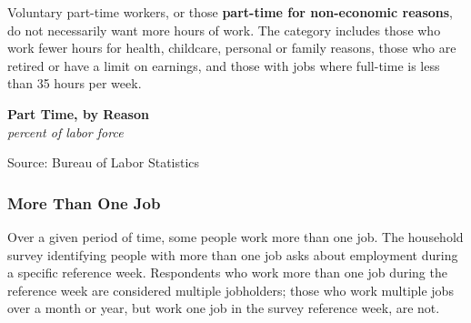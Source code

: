 \documentclass{report}
\makeatletter
\newcommand{\tbllink}[1]{\href{https://raw.githubusercontent.com/bdecon/US-chartbook/master/chartbook/data/#1}{\faTable}}
\newcommand*\short[1]{\expandafter\@gobbletwo\number\numexpr#1\relax}
\newcommand{\absnode}[3]{\node[below right, align=left] at (axis cs: #1,#2) {#3};}
\newcommand{\shdateaxisticks}{
		date coordinates in=x, axis line style={draw=none},
		xmax={2023-11-01},
		max space between ticks=40,	    
		xtick={{1990-01-01}, {1995-01-01}, {2000-01-01}, 
			{2005-01-01}, {2010-01-01}, {2015-01-01}, {2020-01-01}},
		minor xtick={},
		enlarge y limits={0.06}, enlarge x limits={0.01},
		}
\newcommand{\bbar}[2]{extra #1 ticks = {{#2}}, extra #1 tick labels = ,
		extra #1 tick style = {grid=major, grid style={thick, black!25}},}
\newcommand{\stdline}[4]{\addplot[very thick, no markers, color=#1] 
		table [x=#2, y=#3, col sep=comma] {#4};	}
\newcommand{\rebars}{
		\fill[color=black!10] (axis cs:{2007-12-01},\pgfkeysvalueof{/pgfplots/ymin}) rectangle 
			(axis cs:{2009-07-01}, \pgfkeysvalueof{/pgfplots/ymax});
		\fill[color=black!10] (axis cs:{2001-03-01},\pgfkeysvalueof{/pgfplots/ymin}) rectangle 
			(axis cs:{2001-11-01}, \pgfkeysvalueof{/pgfplots/ymax});
		\fill[color=black!10] (axis cs:{2020-02-01},\pgfkeysvalueof{/pgfplots/ymin}) rectangle 
			(axis cs:{2020-05-01}, \pgfkeysvalueof{/pgfplots/ymax});}
\makeatother
\begin{document}
{\begin{minipage}{0.76\textwidth}
Voluntary part-time workers, or those \textbf{part-time for non-economic reasons}, do not necessarily want more hours of work. The category includes those who work fewer hours for health, childcare, personal or family reasons, those who are retired or have a limit on earnings, and those with jobs where full-time is less than 35 hours per week. 
\end{minipage}

\begin{minipage}{0.43\textwidth}
\normalsize \textbf{Part Time, by Reason}\\
\footnotesize{\textit{percent of labor force}}
\vspace{4.2cm}

\hspace{2mm} 

\footnotesize{Source: Bureau of Labor Statistics} \hfill \tbllink{parttime.csv} \ \ 
\end{minipage}\hspace{5mm}
\begin{minipage}{0.29\textwidth}
\small 
\end{minipage}
\vspace{1mm}

\begin{minipage}{0.76\textwidth}
\subsubsection*{More Than One Job}
\small Over a given period of time, some people work more than one job. The household survey identifying people with more than one job asks about employment during a specific reference week. Respondents who work more than one job during the reference week are considered multiple jobholders; those who work multiple jobs over a month or year, but work one job in the survey reference week, are not. 
\end{minipage}

}
\end{document}
